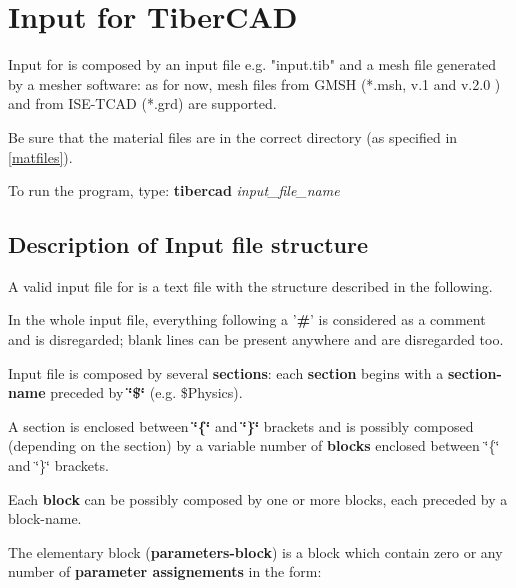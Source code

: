 




\chapter{Input for TiberCAD }

Input for  \TiberCAD{} is  composed by an  input  file e.g. "input.tib" and a mesh file generated by a mesher software: as for  now, mesh files from GMSH (*.msh,  v.1 and v.2.0 )  and from ISE-TCAD (*.grd) are  supported.

Be sure that the material files are   in the  correct directory  (as specified in \ref{matfiles}).

To run the program, type:
\textbf{tibercad}  \textit{input\_file\_name}  



\section {Description of Input  file structure }

A valid  input file for \TiberCAD{} is a  text file with the    structure  described in the following.


  In the whole input file, everything  following a '\textbf{\#}' is considered as a comment and is disregarded;
 blank lines can be present anywhere and are disregarded too.

Input file is composed by several \textbf{sections}:
%
each \textbf{section} begins with a \textbf{section-name} preceded by \textbf{\char`\"{}\$\char`\"{}} (e.g. \$Physics).

A section is enclosed between  \textbf{\char`\"{}\{\char`\"{}} and \textbf{\char`\"{}\}\char`\"{}} brackets and is possibly composed  (depending on the  section)
  by a variable number   of  \textbf{blocks}  enclosed between  \char`\"{}\{\char`\"{} and \char`\"{}\}\char`\"{} brackets.

   Each  \textbf{block} can be possibly composed by one or more blocks, each preceded by a block-name. 
 

The  elementary block (\textbf{parameters-block}) is a block which  contain 
zero or any number of   \textbf{parameter assignements} in the  form:

